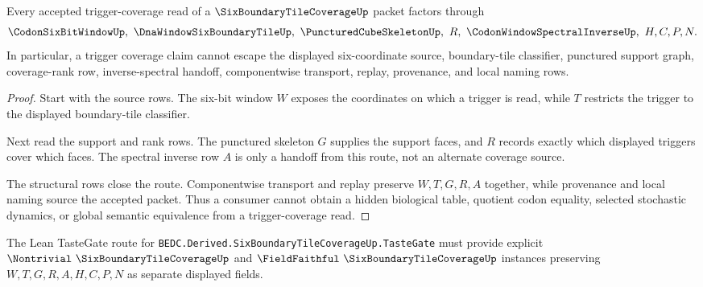 \begin{theorem}
\label{thm:six-boundary-tile-trigger-nonescape}
Every accepted trigger-coverage read of a $\SixBoundaryTileCoverageUp$ packet factors through
$$
\CodonSixBitWindowUp,\ \DnaWindowSixBoundaryTileUp,\ \PuncturedCubeSkeletonUp,\ R,\ \CodonWindowSpectralInverseUp,\ H,C,P,N .
$$
In particular, a trigger coverage claim cannot escape the displayed six-coordinate source, boundary-tile classifier, punctured support graph, coverage-rank row, inverse-spectral handoff, componentwise transport, replay, provenance, and local naming rows.
\end{theorem}
\begin{proof}
Start with the source rows. The six-bit window $W$ exposes the coordinates on which a trigger is read, while $T$ restricts the trigger to the displayed boundary-tile classifier.

Next read the support and rank rows. The punctured skeleton $G$ supplies the support faces, and $R$ records exactly which displayed triggers cover which faces. The spectral inverse row $A$ is only a handoff from this route, not an alternate coverage source.

The structural rows close the route. Componentwise transport and replay preserve $W,T,G,R,A$ together, while provenance and local naming source the accepted packet. Thus a consumer cannot obtain a hidden biological table, quotient codon equality, selected stochastic dynamics, or global semantic equivalence from a trigger-coverage read.
\end{proof}



The Lean TasteGate route for \texttt{BEDC.Derived.SixBoundaryTileCoverageUp.TasteGate} must provide explicit $\Nontrivial\ \SixBoundaryTileCoverageUp$ and $\FieldFaithful\ \SixBoundaryTileCoverageUp$ instances preserving $W,T,G,R,A,H,C,P,N$ as separate displayed fields.

